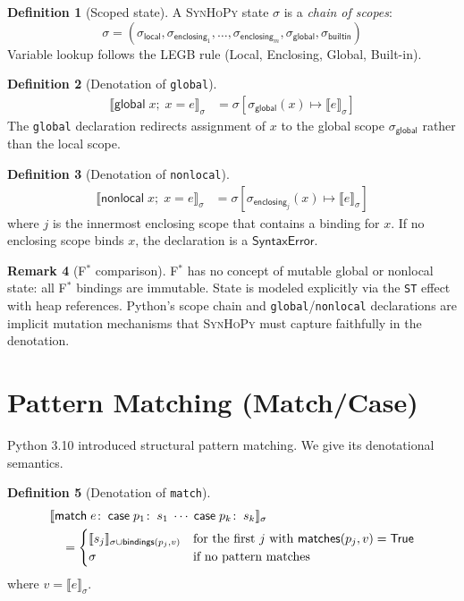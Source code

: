 \documentclass[11pt,a4paper]{report}
\theoremstyle{definition}
\newtheorem{definition}{Definition}[chapter]
\newtheorem{remark}[definition]{Remark}
\theoremstyle{plain}
\newcommand{\den}[1]{\llbracket #1 \rrbracket}
\newcommand{\fstar}{F$^{*}$}
\newcommand{\synhopy}{\textsc{SynHoPy}}
\begin{document}
\begin{definition}[Scoped state]
\label{def:scoped-state}
A \synhopy{} state $\sigma$ is a \emph{chain of scopes}:
\[
  \sigma = (\sigma_{\mathsf{local}}, \sigma_{\mathsf{enclosing}_1}, \ldots,
    \sigma_{\mathsf{enclosing}_m}, \sigma_{\mathsf{global}}, \sigma_{\mathsf{builtin}})
\]
Variable lookup follows the LEGB rule (Local, Enclosing, Global, Built-in).
\end{definition}

\begin{definition}[Denotation of \texttt{global}]
\begin{align}
  \den{\mathsf{global}\;x;\; x = e}_\sigma
    &= \sigma[\sigma_{\mathsf{global}}(x) \mapsto \den{e}_\sigma]
\end{align}
The \lstinline[style=python]{global} declaration redirects assignment of $x$
to the global scope $\sigma_{\mathsf{global}}$ rather than the local scope.
\end{definition}

\begin{definition}[Denotation of \texttt{nonlocal}]
\begin{align}
  \den{\mathsf{nonlocal}\;x;\; x = e}_\sigma
    &= \sigma[\sigma_{\mathsf{enclosing}_j}(x) \mapsto \den{e}_\sigma]
\end{align}
where $j$ is the innermost enclosing scope that contains a binding for $x$.
If no enclosing scope binds $x$, the declaration is a
$\mathsf{SyntaxError}$.
\end{definition}

\begin{remark}[\fstar{} comparison]
\fstar{} has no concept of mutable global or nonlocal state: all \fstar{}
bindings are immutable.  State is modeled explicitly via the
\lstinline[style=fstar]|ST| effect with heap references.  Python's scope
chain and \lstinline[style=python]{global}/\lstinline[style=python]{nonlocal}
declarations are implicit mutation mechanisms that \synhopy{} must capture
faithfully in the denotation.
\end{remark}


\section{Pattern Matching (Match/Case)}

Python 3.10 introduced structural pattern matching.  We give its
denotational semantics.

\begin{definition}[Denotation of \texttt{match}]
\begin{align}
  &\den{\mathsf{match}\;e\!:\; \mathsf{case}\;p_1\!:\;s_1 \;\cdots\; \mathsf{case}\;p_k\!:\;s_k}_\sigma \notag\\
  &\quad= \begin{cases}
    \den{s_j}_{\sigma \cup \mathsf{bindings}(p_j, v)}
      & \text{for the first $j$ with $\mathsf{matches}(p_j, v) = \mathsf{True}$} \\
    \sigma & \text{if no pattern matches}
  \end{cases}
\end{align}
where $v = \den{e}_\sigma$.
\end{definition}
\end{document}
